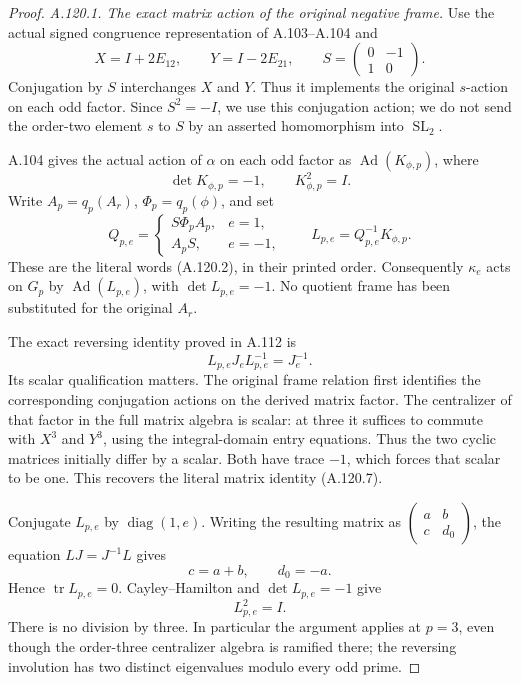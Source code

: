 \begin{proof}
\emph{A.120.1. The exact matrix action of the original negative frame.}
Use the actual signed congruence representation of A.103--A.104 and
\[
 X=I+2E_{12},\qquad Y=I-2E_{21},\qquad
 S=\begin{pmatrix}0&-1\\1&0\end{pmatrix}.
\]
Conjugation by \(S\) interchanges \(X\) and \(Y\). Thus it implements
the original \(s\)-action on each odd factor. Since \(S^2=-I\),
we use this conjugation action; we do not send the order-two element
\(s\) to \(S\) by an asserted homomorphism into \(\operatorname{SL}_2\).

A.104 gives the actual action of \(\alpha\) on each odd factor as
\(\operatorname{Ad}(K_{\phi,p})\), where
\[
       \det K_{\phi,p}=-1,\qquad K_{\phi,p}^2=I.
\]
Write \(A_p=q_p(A_r)\), \(\Phi_p=q_p(\phi)\), and set
\[
 Q_{p,e}=
 \begin{cases}
 S\Phi_pA_p,&e=1,\\
 A_pS,&e=-1,
 \end{cases}
 \qquad
 L_{p,e}=Q_{p,e}^{-1}K_{\phi,p}.
 \tag{A.120.6}
\]
These are the literal words (A.120.2), in their printed order.
Consequently \(\kappa_e\) acts on \(G_p\) by
\(\operatorname{Ad}(L_{p,e})\), with \(\det L_{p,e}=-1\).
No quotient frame has been substituted for the original \(A_r\).

The exact reversing identity proved in A.112 is
\[
                  L_{p,e}J_eL_{p,e}^{-1}=J_e^{-1}.
 \tag{A.120.7}
\]
Its scalar qualification matters. The original frame relation first
identifies the corresponding conjugation actions on the derived
matrix factor. The centralizer of that factor in the full matrix
algebra is scalar: at three it suffices to commute with \(X^3\)
and \(Y^3\), using the integral-domain entry equations.
Thus the two cyclic matrices initially differ by a scalar.
Both have trace \(-1\), which forces that scalar to be one.
This recovers the literal matrix identity (A.120.7).

Conjugate \(L_{p,e}\) by \(\operatorname{diag}(1,e)\).
Writing the resulting matrix as
\(\left(\begin{smallmatrix}a&b\\c&d_0\end{smallmatrix}\right)\),
the equation \(LJ=J^{-1}L\) gives
\[
                         c=a+b,\qquad d_0=-a.
\]
Hence \(\operatorname{tr}L_{p,e}=0\).
Cayley--Hamilton and \(\det L_{p,e}=-1\) give
\[
                            L_{p,e}^2=I.
 \tag{A.120.8}
\]
There is no division by three. In particular the argument applies
at \(p=3\), even though the order-three centralizer algebra is ramified
there; the reversing involution has two distinct eigenvalues modulo
every odd prime.


\end{proof}
